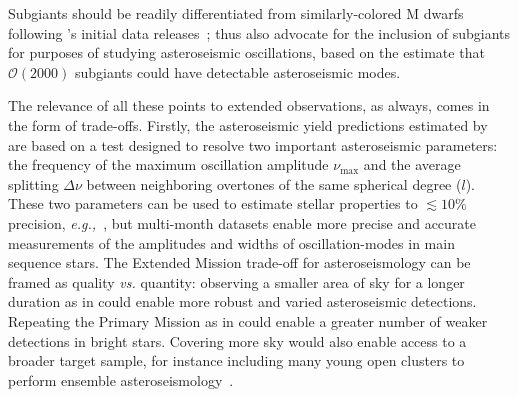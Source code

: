Subgiants should be readily differentiated from similarly-colored M dwarfs following \gaia\!'s initial data releases~\citep{perryman_gaia_2002};
  thus also advocate for the inclusion of subgiants for purposes of studying asteroseismic oscillations, based on the estimate that $\mathcal{O}(2000)$ subgiants could have detectable asteroseismic modes.

The relevance of all these points to extended \tess observations, as always, comes in the form of trade-offs.
Firstly, the asteroseismic yield predictions estimated by~ are based on a test designed to resolve two important asteroseismic parameters: the frequency of the maximum oscillation amplitude $\nu_{\mathrm{max}}$ and the average splitting $\Delta \nu$ between neighboring overtones of the same spherical degree ($l$).
These two parameters can be used to estimate stellar properties to $\lesssim 10\%$ precision, \textit{e.g.,}~\citep{aguirre_verifying_2012}, but multi-month datasets enable more precise and accurate measurements of the amplitudes and widths of oscillation-modes in main sequence stars.
The Extended Mission trade-off for asteroseismology can be framed as quality \textit{vs.} quantity: observing a smaller area of sky for a longer duration as in \npole\:could enable more robust and varied asteroseismic detections.
Repeating the Primary Mission as in \npole\:could enable a greater number of weaker detections in bright stars.
Covering more sky would also enable access to a broader target sample, for instance including many young open clusters to perform ensemble asteroseismology~\citep{aerts_ensemble_2013}.

\begin{comment}
\paragraph{Measuring rotation periods for a large sample of stars}
Another reason to observing more rather than less sky is to enable measurements of rotation periods for the largest possible sample of stars.
For instance~\citet{nielsen_rotation_2013} reported rotation periods derived from starspot variability for 12151 \kepler stars.
Such studies (cf their introduction) are important for studies of stellar evolution and stellar dynamos.

They also bear upon radial velocity searches for exoplanets, in which stellar activity can effectively `mask' planetary orbital periods commensurate with the stellar rotation period.
The matters for prospects of detecting small planets in the habitable zones of M dwarfs~\citep{newton_HZ_2016}.

THIS ALSO MATTERS FOR STELLAR ACTIVITY STUDIES.
Long timescale characterization of stellar activity
E.g. through spot detection, or other indicators of stellar magnetic activity.
\end{comment}


